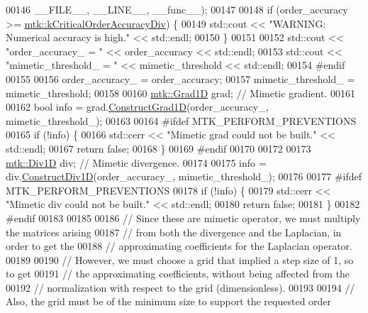 \begin{DoxyCode}
00146                       \_\_FILE\_\_, \_\_LINE\_\_, \_\_func\_\_);
00147 
00148   \textcolor{keywordflow}{if} (order\_accuracy >= \hyperlink{group__c01-roots_ga0898eef2108473e44a5223932d571c31}{mtk::kCriticalOrderAccuracyDiv}) \{
00149     std::cout << \textcolor{stringliteral}{"WARNING: Numerical accuracy is high."} << std::endl;
00150   \}
00151 
00152   std::cout << \textcolor{stringliteral}{"order\_accuracy\_ = "} << order\_accuracy << std::endl;
00153   std::cout << \textcolor{stringliteral}{"mimetic\_threshold\_ = "} << mimetic\_threshold << std::endl;
00154 \textcolor{preprocessor}{  #endif}
00155 
00156   order\_accuracy\_ = order\_accuracy;
00157   mimetic\_threshold\_ = mimetic\_threshold;
00158 
00160   \hyperlink{classmtk_1_1Grad1D}{mtk::Grad1D} grad; \textcolor{comment}{// Mimetic gradient.}
00161 
00162   \textcolor{keywordtype}{bool} info = grad.\hyperlink{classmtk_1_1Grad1D_a74ef5245cfae6fd158bd7f563a0c2e52}{ConstructGrad1D}(order\_accuracy\_, mimetic\_threshold\_);
00163 
00164 \textcolor{preprocessor}{  #ifdef MTK\_PERFORM\_PREVENTIONS}
00165   \textcolor{keywordflow}{if} (!info) \{
00166     std::cerr << \textcolor{stringliteral}{"Mimetic grad could not be built."} << std::endl;
00167     \textcolor{keywordflow}{return} \textcolor{keyword}{false};
00168   \}
00169 \textcolor{preprocessor}{  #endif}
00170 
00172 
00173   \hyperlink{classmtk_1_1Div1D}{mtk::Div1D} div; \textcolor{comment}{// Mimetic divergence.}
00174 
00175   info = div.\hyperlink{classmtk_1_1Div1D_a52fcd1542f11e606e36bd188e48bfdf7}{ConstructDiv1D}(order\_accuracy\_, mimetic\_threshold\_);
00176 
00177 \textcolor{preprocessor}{  #ifdef MTK\_PERFORM\_PREVENTIONS}
00178   \textcolor{keywordflow}{if} (!info) \{
00179     std::cerr << \textcolor{stringliteral}{"Mimetic div could not be built."} << std::endl;
00180     \textcolor{keywordflow}{return} \textcolor{keyword}{false};
00181   \}
00182 \textcolor{preprocessor}{  #endif}
00183 
00185 
00186   \textcolor{comment}{// Since these are mimetic operator, we must multiply the matrices arising}
00187   \textcolor{comment}{// from both the divergence and the Laplacian, in order to get the}
00188   \textcolor{comment}{// approximating coefficients for the Laplacian operator.}
00189 
00190   \textcolor{comment}{// However, we must choose a grid that implied a step size of 1, so to get}
00191   \textcolor{comment}{// the approximating coefficients, without being affected from the}
00192   \textcolor{comment}{// normalization with respect to the grid (dimensionless).}
00193 
00194   \textcolor{comment}{// Also, the grid must be of the minimum size to support the requested order}

\end{DoxyCode}
